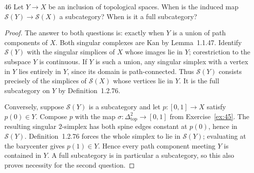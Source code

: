 \begin{exercise}{46}
Let $Y\to X$ be an inclusion of topological spaces. When is the induced map
$\mathcal S(Y)\to\mathcal S(X)$ a subcategory? When is it a full subcategory?

\begin{proof}
The answer to both questions is: exactly when $Y$ is a union
of path components of $X$.
Both singular complexes are Kan by Lemma~1.1.47.
Identify $\mathcal S(Y)$ with the singular simplices of $X$
whose images lie in $Y$; corestriction to the subspace $Y$
is continuous. If $Y$ is such a union, any singular simplex
with a vertex in $Y$ lies entirely in $Y$, since its domain
is path-connected. Thus $\mathcal S(Y)$ consists precisely
of the simplices of $\mathcal S(X)$ whose vertices lie in $Y$.
It is the full subcategory on $Y$ by Definition~1.2.76.

Conversely, suppose $\mathcal S(Y)$ is a subcategory and let
$p\colon[0,1]\to X$ satisfy $p(0)\in Y$.
Compose $p$ with the map
$\sigma\colon\Delta^2_{\mathrm{top}}\to[0,1]$
from Exercise~\ref{ex:45}.
The resulting singular $2$-simplex has both spine edges
constant at $p(0)$, hence in $\mathcal S(Y)$.
Definition~1.2.76 forces the whole simplex to lie in
$\mathcal S(Y)$; evaluating at the barycenter gives
$p(1)\in Y$. Hence every path component meeting $Y$ is
contained in $Y$.
A full subcategory is in particular a subcategory, so this
also proves necessity for the second question.
\end{proof}
\end{exercise}
